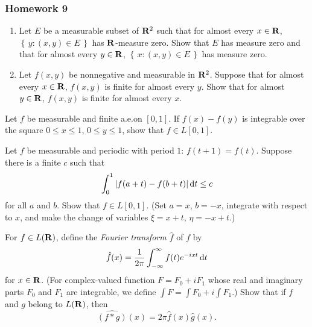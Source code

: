 \subsubsection{Homework 9}
\setcounter{exercise}{0}
\setcounter{equation}{0}

\begin{problem}
  \hfill
  \begin{enumerate}[label=(\alph*),noitemsep]
  \item Let $E$ be a measurable subset of $\mathbf{R}^2$ such that for almost
    every $x\in\mathbf{R}$, $\left\{\,y:(x,y)\in E\,\right\}$ has $\mathbf{R}$-measure
    zero. Show that $E$ has measure zero and that for almost every
    $y\in\mathbf{R}$, $\left\{\,x:(x,y)\in E\,\right\}$ has measure zero.
  \item Let $f(x,y)$ be nonnegative and measurable in $\mathbf{R}^2$. Suppose
    that for almost every $x\in\mathbf{R}$, $f(x,y)$ is finite for almost every
    $y$. Show that for almost $y\in\mathbf{R}$, $f(x,y)$ is finite for almost
    every $x$.
  \end{enumerate}
\end{problem}
\begin{solution}
\end{solution}

\begin{problem}
  Let $f$ be measurable and finite a.e.\@ on $[0,1]$. If $f(x)-f(y)$ is
  integrable over the square $0\leq x\leq 1$, $0\leq y\leq 1$, show that
  $f\in L[0,1]$.
\end{problem}
\begin{solution}
\end{solution}

\begin{problem}
  Let $f$ be measurable and periodic with period $1$:
  $f(t+1)=f(t)$. Suppose there is a finite $c$ such that
  \[
    \int_0^1|f(a+t)-f(b+t)|\mathop{}\!\mathrm{d} t\leq c
  \]
  for all $a$ and $b$. Show that $f\in L[0,1]$. (Set $a=x$, $b=-x$,
  integrate with respect to $x$, and make the change of variables
  $\xi=x+t$, $\eta=-x+t$.)
\end{problem}
\begin{solution}
\end{solution}

\begin{problem}
  For $f\in L(\mathbf{R})$, define the \emph{Fourier transform $\hat f$} of $f$
  by
  \[
    \hat f(x)=\frac{1}{2\pi}\int_{-\infty}^\infty f(t)e^{-ixt}\mathop{}\!\mathrm{d} t
  \]
  for $x\in\mathbf{R}$. (For complex-valued function $F=F_0+iF_1$ whose real and
  imaginary parts $F_0$ and $F_1$ are integrable, we define
  $\int F=\int F_0+i\int F_1$.) Show that if $f$ and $g$ belong to
  $L(\mathbf{R})$, then
  \[
    \widehat{(f*g)}(x)=2\pi\hat f(x)\hat g(x).
  \]
\end{problem}
\begin{solution}
\end{solution}

